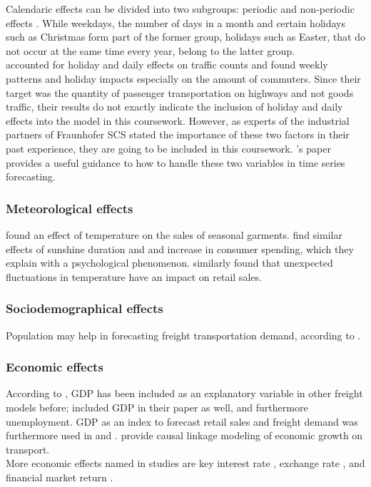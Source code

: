 \documentclass[a4paper, 11pt]{article}
\begin{document}
Calendaric effects can be divided into two subgroups: periodic and non-periodic effects \citep{Godfrey.2000}. While weekdays, the number of days in a month and certain holidays such as Christmas form part of the former group, holidays such as Easter, that do not occur at the same time every year, belong to the latter group.\\ 
\cite{Cools.2009} accounted for holiday and daily effects on traffic counts and found weekly patterns and holiday impacts especially on the amount of commuters. Since their target was the quantity of passenger transportation on highways and not goods traffic, their results do not exactly indicate the inclusion of holiday and daily effects into the model in this coursework. However, as experts of the industrial partners of Fraunhofer SCS stated the importance of these two factors in their past experience, they are going to be included in this coursework. \cite{Cools.2009}'s paper provides a useful guidance to how to handle these two variables in time series forecasting.\


\subsubsection{Meteorological effects}

\cite{Bahng.2012} found an effect of temperature on the sales of seasonal garments.\cite{Murray.2010} find similar effects of sunshine duration and and increase in consumer spending, which they explain with a psychological phenomenon. \cite{Bertrand.2015} similarly found that unexpected fluctuations in temperature have an impact on retail sales. 

\subsubsection{Sociodemographical effects}

Population may help in forecasting freight transportation demand, according to \cite{Saidi.2017}.


\subsubsection{Economic effects}
According to \cite{JONG.2004}, GDP has been included as an explanatory variable in other freight models before; \cite{Intihar} included GDP in their paper as well, and furthermore unemployment. GDP as an index to forecast retail sales and freight demand was furthermore used in \cite{Guo.2013} and \cite{Fite.2002}. \cite{Saidi.2017} provide causal linkage modeling of economic growth on transport.\\
More economic effects named in studies are key interest rate \citep{Lahiri.2006}, exchange rate \cite{Kim.2011}, and financial market return \cite{Osadchiy.2013}.
\end{document}
